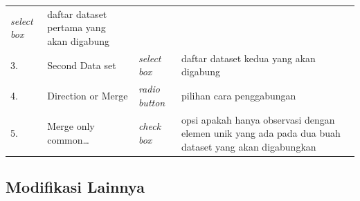 \documentclass[12pt,]{krantz}
\begin{document}
\begin{longtable}[]{@{}llll@{}}
\begin{minipage}[t]{0.09\columnwidth}
\emph{select box}\strut
\end{minipage} & \begin{minipage}[t]{0.61\columnwidth}\raggedright
daftar dataset pertama yang akan digabung\strut
\end{minipage}\tabularnewline
\begin{minipage}[t]{0.04\columnwidth}\raggedright
3.\strut
\end{minipage} & \begin{minipage}[t]{0.14\columnwidth}\raggedright
Second Data set\strut
\end{minipage} & \begin{minipage}[t]{0.09\columnwidth}\raggedright
\emph{select box}\strut
\end{minipage} & \begin{minipage}[t]{0.61\columnwidth}\raggedright
daftar dataset kedua yang akan digabung\strut
\end{minipage}\tabularnewline
\begin{minipage}[t]{0.04\columnwidth}\raggedright
4.\strut
\end{minipage} & \begin{minipage}[t]{0.14\columnwidth}\raggedright
Direction or Merge\strut
\end{minipage} & \begin{minipage}[t]{0.09\columnwidth}\raggedright
\emph{radio button}\strut
\end{minipage} & \begin{minipage}[t]{0.61\columnwidth}\raggedright
pilihan cara penggabungan\strut
\end{minipage}\tabularnewline
\begin{minipage}[t]{0.04\columnwidth}\raggedright
5.\strut
\end{minipage} & \begin{minipage}[t]{0.14\columnwidth}\raggedright
Merge only common\ldots{}\strut
\end{minipage} & \begin{minipage}[t]{0.09\columnwidth}\raggedright
\emph{check box}\strut
\end{minipage} & \begin{minipage}[t]{0.61\columnwidth}\raggedright
opsi apakah hanya observasi dengan elemen unik yang ada pada dua buah dataset yang akan digabungkan\strut
\end{minipage}\tabularnewline
\bottomrule
\end{longtable}

\hypertarget{modifikasi-lainnya}{%
\subsection{Modifikasi Lainnya}\label{modifikasi-lainnya}}
\end{document}
